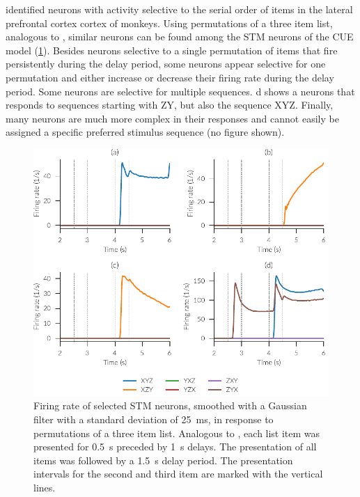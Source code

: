 \Textcite{ninokura2003} identified neurons with activity selective to the serial order of items in the lateral prefrontal cortex cortex of monkeys.
Using permutations of a three item list, analogous to \textcite{ninokura2003}, similar neurons can be found among the STM neurons of the CUE model (\cref{fig:seqsel}).
Besides neurons selective to a single permutation of items that fire persistently during the delay period, some neurons appear selective for one permutation and either increase or decrease their firing rate during the delay period.
Some neurons are selective for multiple sequences.
d shows a neurons that responds to sequences starting with ZY, but also the sequence XYZ\@.
Finally, many neurons are much more complex in their responses and cannot easily be assigned a specific preferred stimulus sequence (no figure shown).
\begin{figure}
    \centering
    \includegraphics{figures/seqsel}
    \caption[Firirng rate of selected STM neurons.]{Firing rate of selected STM neurons, smoothed with a Gaussian filter with a standard deviation of \SI{25}{\milli\second}, in response to permutations of a three item list. Analogous to \textcite{ninokura2003}, each list item was presented for \SI{0.5}{\second} preceded by \SI{1}{\second} delays. The presentation of all items was followed by a \SI{1.5}{\second} delay period. The presentation intervals for the second and third item are marked with the vertical lines.}\label{fig:seqsel}
\end{figure}

